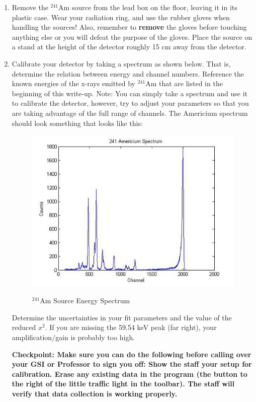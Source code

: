 \documentclass{../lab}
\begin{document}
\begin{enumerate}
    \item Remove the $^{241}$Am source from the lead box on the floor, leaving it in its plastic case. Wear your radiation ring, and use the rubber gloves when handling the sources! Also, remember to \textbf{remove} the gloves before touching anything else or you will defeat the purpose of the gloves. Place the source on a stand at the height of the detector roughly 15 cm away from the detector.

    \item Calibrate your detector by taking a spectrum as shown below. That is, determine the relation between energy and channel numbers. Reference the known energies of the x-rays emitted by $^{241}$Am that are listed in the beginning of this write-up. Note: You can simply take a spectrum and use it to calibrate the detector, however, try to adjust your parameters so that you are taking advantage of the full range of channels. The Americium spectrum should look something that looks like this:
    \begin{figure}[h]
        \centering
        \href{http://experimentationlab.berkeley.edu/sites/default/files/images/550px-COMimage02.jpg}{\includegraphics[width=0.8\linewidth]{images/550px-COMimage02.jpg}}
        \caption{$^{241}$Am Source Energy Spectrum}
        \label{fig:550px-COMimage02}
    \end{figure}
 
	Determine the uncertainties in your fit parameters and the value of the reduced $x^2$. If you are missing the 59.54 keV peak (far right), your amplification/gain is probably too high. 
	
	\textbf{Checkpoint: Make sure you can do the following before calling over your GSI or Professor to sign you off:
	Show the staff your setup for calibration. Erase any existing data in the program (the button to the right of the little traffic light in the toolbar). The staff will verify that data collection is working properly.}


\end{enumerate}
\end{document}
